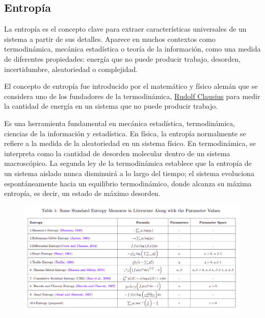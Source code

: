 \subsection{Entropía}
\begin{definicion}[Entropía]\label{def:entropy}
La entropía es el concepto clave para extraer características universales de un sistema a partir de sus 
detalles. Aparece en muchos contextos como termodinámica, mecánica estadística o teoría de la información, como 
una medida de diferentes propiedades: energía que no puede producir trabajo, desorden, incertidumbre, 
aleatoriedad o complejidad.\cite{gen-entr-review}

El concepto de entropía fue introducido por el matemático y físico alemán que se considera uno de los fundadores 
de la termodinámica,
\href{https://www.engineeringenotes.com/thermal-engineering/entropy/entropy-clausius-theorem-property-equations-and-representation-thermodynamics/49188}{Rudolf Clausius} 
para medir la cantidad de energía en un sistema que no puede producir trabajo.

Es una herramienta fundamental en mecánica estadística, termodinámica, ciencias de la información
y estadística. En física, la entropía normalmente se refiere a la medida de la aleatoriedad en un sistema físico. 
En termodinámica, se interpreta como la cantidad de desorden molecular dentro de un sistema macroscópico. 
La segunda ley de la termodinámica establece que la entropía de un sistema aislado nunca disminuirá
a lo largo del tiempo; el sistema evoluciona espontáneamente hacia un equilibrio termodinámico, donde alcanza su
máxima entropía, es decir, un estado de máximo desorden.\cite{t-entropy}

\begin{figure}[h!]
    \centering
    \includegraphics[scale=0.5]{./img/entropies.png}
    \label{img:entropies}
\end{figure}
\end{definicion}

